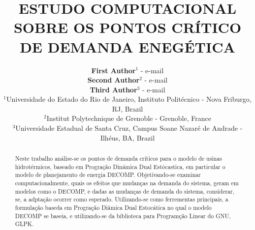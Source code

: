 \documentclass[12pt,fleqn]{article}
\title{ESTUDO COMPUTACIONAL SOBRE OS PONTOS CR\'ITICO DE DEMANDA ENEG\'ETICA}%
\author
    {\rm \begin{tabular}{l} 
    \textbf{First Author}$^{1}$ - {\textnormal e-mail}\\%
    \textbf{Second Author}$^{2}$ - {\textnormal e-mail}\\
    \textbf{Third Author}$^{3}$ - {\textnormal e-mail}\\
    {\fontsize{11}{0}\selectfont $^{1}$Universidade do Estado do Rio de Janeiro, Instituto Politécnico - Nova Friburgo, RJ, Brazil}\vspace*{-0.05cm} \\
    {\fontsize{11}{0}\selectfont $^{2}$Institut Polytechnique de Grenoble - Grenoble, France}\vspace*{-0.05cm}\\
    {\fontsize{11}{0}\selectfont $^{3}$Universidade Estadual de Santa Cruz, Campus Soane Nazaré de Andrade - Ilhéus, BA, Brazil}
  \end{tabular}}
\renewcommand{\headrulewidth}{0.0pt}
\begin{document}
\maketitle

\thispagestyle{firspagetstyle}

\renewcommand{\headrulewidth}{0.0pt}
\rhead{}

\begin{abstract}
  Neste trabalho an\'alise-se os pontos de demanda cr\'iticos para o modelo de usinas hidrot\'ermicos, baseado em
  Progra\c c\~ao Din\'amica Dual Est\'ocastica, em particular o modelo de planejamento de energia DECOMP.
  Objetivando-se examinar computacionalmente, quais os efeitos que mudan\c cas na demanda do sistema, geram em modelos
  como o DECOMP, e dadas as mudan\c cas de demanda do sistema, considerar, se, a adpta\c c\~ao
  ocorrer como esperado. Utilizando-se como ferrementas principais, a formula\c c\~ao baseda em Progra\c c\~ao
  Di\^amica Dual Estoc\'atica no qual o modelo DECOMP se baseia, e utilizando-se da biblioteca para Program\c c\~ao Linear do GNU, GLPK.
\end{abstract}


\pagestyle{fancy}
\end{document}
